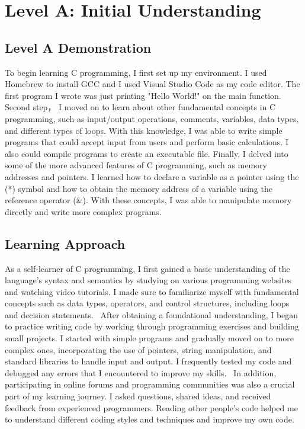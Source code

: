 \documentclass[a4paper, 11pt]{report}
\begin{document}

\tableofcontents





\newpage
\section{Level A: Initial Understanding}
\vspace{5mm}
\subsection{Level A Demonstration}
To begin learning C programming, I first set up my environment. I used Homebrew to install GCC and I used Visual Studio Code as my code editor. The first program I wrote was just printing "Hello World!" on the main function.
Second step， I moved on to learn about other fundamental concepts in C programming, such as input/output operations, comments, variables, data types, and different types of loops. With this knowledge, I was able to write simple programs that could accept input from users and perform basic calculations. I also could compile programs to create an executable file.
Finally, I delved into some of the more advanced features of C programming, such as memory addresses and pointers. I learned how to declare a variable as a pointer using the (*) symbol and how to obtain the memory address of a variable using the reference operator (&). With these concepts, I was able to manipulate memory directly and write more complex programs.

\subsection{Learning Approach}
As a self-learner of C programming, I first gained a basic understanding of the language's syntax and semantics by studying on various programming websites and watching video tutorials. I made sure to familiarize myself with fundamental concepts such as data types, operators, and control structures, including loops and decision statements.
 After obtaining a foundational understanding, I began to practice writing code by working through programming exercises and building small projects. I started with simple programs and gradually moved on to more complex ones, incorporating the use of pointers, string manipulation, and standard libraries to handle input and output. I frequently tested my code and debugged any errors that I encountered to improve my skills.
 In addition, participating in online forums and programming communities was also a crucial part of my learning journey. I asked questions, shared ideas, and received feedback from experienced programmers. Reading other people's code helped me to understand different coding styles and techniques and improve my own code.
\end{document}
